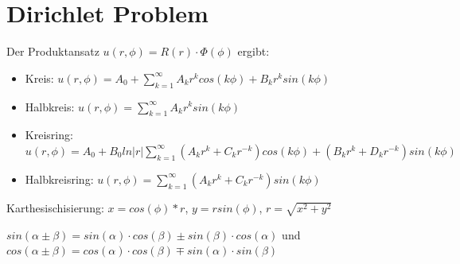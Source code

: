 \documentclass[10pt,a4paper]{article}
\begin{document}
\section{Dirichlet Problem}
Der Produktansatz $u(r, \phi) = R(r) \cdot \Phi(\phi)$ ergibt:
\begin{itemize}
\item
Kreis: $u(r, \phi) = A_0 + \sum\limits_{k=1}^\infty A_k r^k cos(k \phi) + B_k r^k sin(k \phi)$
\item
Halbkreis: $u(r, \phi) = \sum\limits_{k=1}^\infty A_k r^k sin(k \phi)$
\item
Kreisring: $u(r, \phi) = A_0 + B_0 ln|r| \sum\limits_{k=1}^\infty \left(A_k r^k + C_k r^{-k} \right) cos(k \phi) + \left(B_k r^k + D_k r^{-k} \right) sin(k \phi)$
\item
Halbkreisring: $u(r, \phi) = \sum\limits_{k=1}^\infty \left(A_k r^k + C_k r^{-k} \right) sin(k \phi)$
\end{itemize}

Karthesischisierung: $x = cos(\phi)*r$, $y = r sin(\phi)$, $r = \sqrt{x^2 + y^2}$

$sin(\alpha \pm \beta) = sin(\alpha)\cdot cos(\beta) \pm sin(\beta)\cdot cos(\alpha)$ und $cos(\alpha \pm \beta) = cos(\alpha)\cdot cos(\beta) \mp sin(\alpha)\cdot sin(\beta)$
\end{document}
